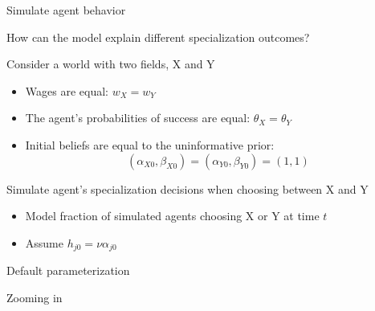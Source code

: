 \begin{frame}{Simulate agent behavior}\label{simulate}


How can the model explain different specialization outcomes?

\vspace{3ex}
Consider a world with two fields, X and Y
\begin{itemize}
    \item Wages are equal: $w_X = w_Y$
    \item The agent's probabilities of success are equal: $\theta_X = \theta_Y$
    \item Initial beliefs are equal to the uninformative prior: \hyperlink{model_beta_11}{}
    \begin{equation*}
        (\alpha_{X0}, \beta_{X0}) = (\alpha_{Y0}, \beta_{Y0}) = (1, 1)
    \end{equation*}
\end{itemize}

\vspace{3ex}
Simulate agent's specialization decisions when choosing between X and Y
\begin{itemize}
    \item Model fraction of simulated agents choosing X or Y at time $t$ 
    \item Assume $h_{j0} = \nu \alpha_{j0}$ \hyperlink{sim_parameterization}{}
\end{itemize}


\end{frame}

\begin{frame}{Default parameterization}\label{sim_default}

% 
\begin{figure}
\centering

\end{figure}

\hyperlink{model_beta_11}{}
\end{frame}

\begin{frame}{Zooming in}


\begin{figure}
\centering

\end{figure}


\end{frame}

